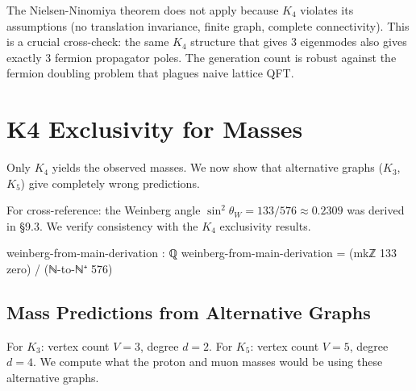 \documentclass[11pt,a4paper]{book}
\def\texorpdfstring#1#2{#2}%
\begin{document}
The Nielsen-Ninomiya theorem does not apply because $K_4$ violates its assumptions (no translation invariance, finite graph, complete connectivity). This is a crucial cross-check: the same $K_4$ structure that gives 3 eigenmodes also gives exactly 3 fermion propagator poles. The generation count is robust against the fermion doubling problem that plagues naive lattice QFT.

\chapter{\texorpdfstring{$K_4$}{K4} Exclusivity for Masses}
\label{chap:K4-exclusivity-masses}

Only $K_4$ yields the observed masses. We now show that alternative graphs ($K_3$, $K_5$) give completely wrong predictions.

For cross-reference: the Weinberg angle $\sin^2\theta_W = 133/576 \approx 0.2309$ was derived in \S9.3. We verify consistency with the $K_4$ exclusivity results.

\begin{code}
weinberg-from-main-derivation : ℚ
weinberg-from-main-derivation = (mkℤ 133 zero) / (ℕ-to-ℕ⁺ 576)
\end{code}

\section{Mass Predictions from Alternative Graphs}

For $K_3$: vertex count $V = 3$, degree $d = 2$. For $K_5$: vertex count $V = 5$, degree $d = 4$. We compute what the proton and muon masses would be using these alternative graphs.
\end{document}
